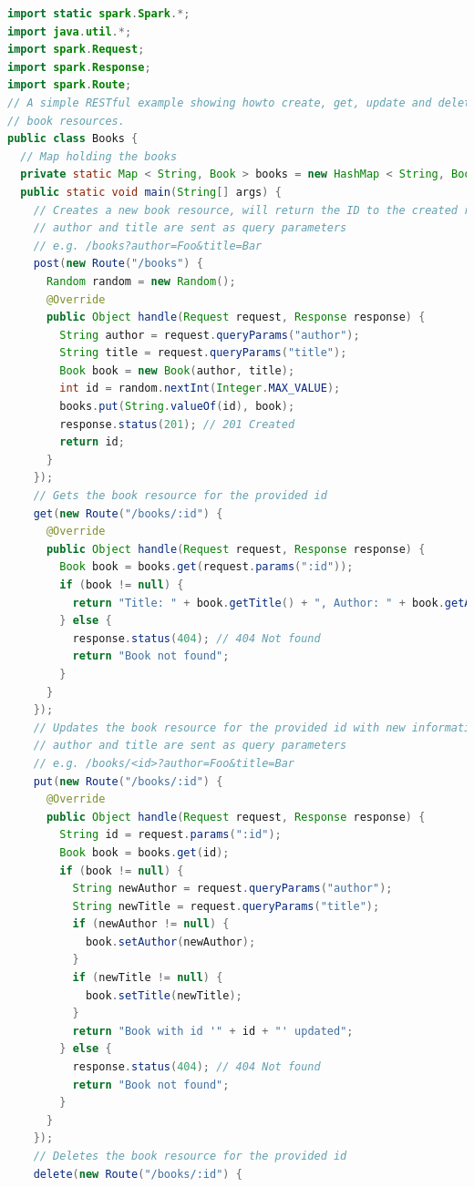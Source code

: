 \documentclass[runningheads]{llncs}
\begin{document}
\begin{center}
\begin{lstlisting}[language=java, basicstyle = \footnotesize, xleftmargin=-.1\textwidth]
import static spark.Spark.*;
import java.util.*;
import spark.Request;
import spark.Response;
import spark.Route;
// A simple RESTful example showing howto create, get, update and delete
// book resources.
public class Books {
  // Map holding the books
  private static Map < String, Book > books = new HashMap < String, Book > ();
  public static void main(String[] args) {
    // Creates a new book resource, will return the ID to the created resource
    // author and title are sent as query parameters
    // e.g. /books?author=Foo&title=Bar
    post(new Route("/books") {
      Random random = new Random();
      @Override
      public Object handle(Request request, Response response) {
        String author = request.queryParams("author");
        String title = request.queryParams("title");
        Book book = new Book(author, title);
        int id = random.nextInt(Integer.MAX_VALUE);
        books.put(String.valueOf(id), book);
        response.status(201); // 201 Created
        return id;
      }
    });
    // Gets the book resource for the provided id
    get(new Route("/books/:id") {
      @Override
      public Object handle(Request request, Response response) {
        Book book = books.get(request.params(":id"));
        if (book != null) {
          return "Title: " + book.getTitle() + ", Author: " + book.getAuthor();
        } else {
          response.status(404); // 404 Not found
          return "Book not found";
        }
      }
    });
    // Updates the book resource for the provided id with new information
    // author and title are sent as query parameters
    // e.g. /books/<id>?author=Foo&title=Bar
    put(new Route("/books/:id") {
      @Override
      public Object handle(Request request, Response response) {
        String id = request.params(":id");
        Book book = books.get(id);
        if (book != null) {
          String newAuthor = request.queryParams("author");
          String newTitle = request.queryParams("title");
          if (newAuthor != null) {
            book.setAuthor(newAuthor);
          }
          if (newTitle != null) {
            book.setTitle(newTitle);
          }
          return "Book with id '" + id + "' updated";
        } else {
          response.status(404); // 404 Not found
          return "Book not found";
        }
      }
    });
    // Deletes the book resource for the provided id
    delete(new Route("/books/:id") {

\end{lstlisting}
\end{center}
\end{document}
